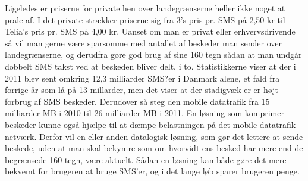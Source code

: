 Ligeledes er priserne for private hen over landegrænserne heller ikke noget at prale af. I det private strækker priserne sig fra 3's pris pr. SMS på 2,50 kr\cite{Pro_4} til Telia's pris pr. SMS på 4,00 kr\cite{Pro_5}. Uanset om man er privat eller erhvervsdrivende så vil man gerne være sparsomme med antallet af beskeder man sender over landegrænserne, og derudfra gøre god brug af sine 160 tegn sådan at man undgår dobbelt SMS takst ved at beskeden bliver delt, i to.
Statistikkerne viser at der i 2011 blev sent omkring 12,3 milliarder SMS?er i Danmark alene, et fald fra forrige år som lå på 13 millarder, men det viser at der stadigvæk er er højt forbrug af SMS beskeder. Derudover så steg den mobile datatrafik fra 15 milliarder MB i 2010 til 26 milliarder MB i 2011\cite{Pro_6}. En løsning som komprimer beskeder kunne også hjælpe til at dæmpe belastningen på det mobile datatrafik netværk.
Derfor vil en eller anden datalogisk løsning, som gør det lettere at sende beskede, uden at man skal bekymre som om hvorvidt ens besked har mere end de begrænsede 160 tegn, være aktuelt. Sådan en løsning kan både gøre det mere bekvemt for brugeren at bruge SMS'er, og i det lange løb sparer brugeren penge.